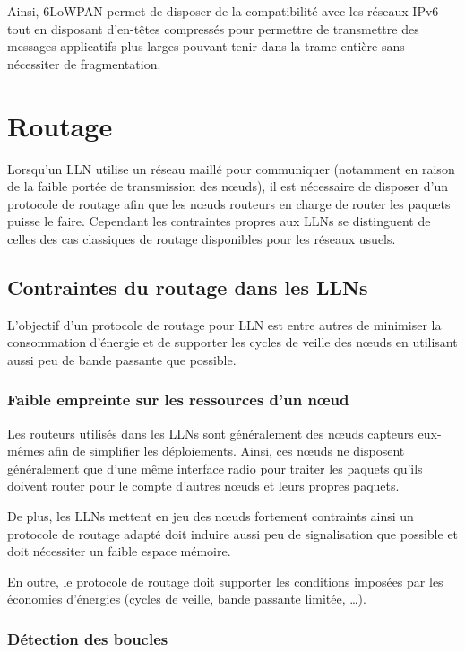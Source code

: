 Ainsi, \ac{6LoWPAN} permet de disposer de la compatibilité avec les réseaux IPv6 tout en disposant d'en-têtes compressés pour permettre de transmettre des messages applicatifs plus larges pouvant tenir dans la trame entière sans nécessiter de fragmentation.

\section{Routage}
\label{gw:routing}

Lorsqu'un \ac{LLN} utilise un réseau maillé pour communiquer (notamment en raison de la faible portée de transmission des nœuds), il est nécessaire de disposer d'un protocole de routage afin que les nœuds routeurs en charge de router les paquets puisse le faire.
Cependant les contraintes propres aux \ac{LLN}s se distinguent de celles des cas classiques de routage disponibles pour les réseaux usuels.

\subsection{Contraintes du routage dans les \ac{LLN}s}

L'objectif d'un protocole de routage pour \ac{LLN} est entre autres de minimiser la consommation d'énergie et de supporter les cycles de veille des nœuds en utilisant aussi peu de bande passante que possible.

\subsubsection{Faible empreinte sur les ressources d'un nœud}

Les routeurs utilisés dans les \ac{LLN}s sont généralement des nœuds capteurs eux-mêmes afin de simplifier les déploiements.
Ainsi, ces nœuds ne disposent généralement que d'une même interface radio pour traiter les paquets qu'ils doivent router pour le compte d'autres nœuds et leurs propres paquets.

De plus, les \ac{LLN}s mettent en jeu des nœuds fortement contraints ainsi un protocole de routage adapté doit induire aussi peu de signalisation que possible et doit nécessiter un faible espace mémoire.

En outre, le protocole de routage doit supporter les conditions imposées par les économies d'énergies (cycles de veille, bande passante limitée, \ldots).

\subsubsection{Détection des boucles}

